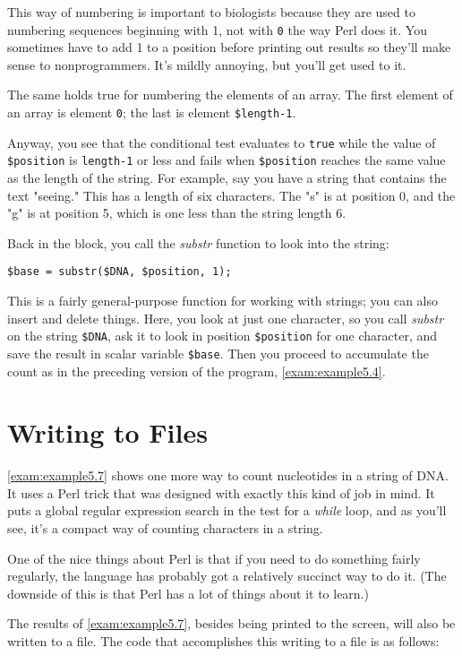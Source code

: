 This way of numbering is important to biologists because they are used to numbering sequences beginning with 1, not with \verb|0| the way Perl does it. You sometimes have to add 1 to a position before printing out results so they'll make sense to nonprogrammers. It's mildly annoying, but you'll get used to it.

The same holds true for numbering the elements of an array. The first element of an array is element \verb|0|; the last is element \verb|$length-1|.

Anyway, you see that the conditional test evaluates to \verb|true| while the value of \verb|$position| is \verb|length-1| or less and fails when \verb|$position| reaches the same value as the length of the string. For example, say you have a string that contains the text "seeing." This has a length of six characters. The "s" is at position 0, and the "g" is at position 5, which is one less than the string length 6.

Back in the block, you call the \textit{substr} function to look into the string: 

\begin{lstlisting}
$base = substr($DNA, $position, 1);
\end{lstlisting}

This is a fairly general-purpose function for working with strings; you can also insert and delete things. Here, you look at just one character, so you call \textit{substr} on the string \verb|$DNA|, ask it to look in position \verb|$position| for one character, and save the result in scalar variable \verb|$base|. Then you proceed to accumulate the count as in the preceding version of the program, \autoref{exam:example5.4}.  
\section{Writing to Files}
\autoref{exam:example5.7} shows one more way to count nucleotides in a string of DNA. It uses a Perl trick that was designed with exactly this kind of job in mind. It puts a global regular expression search in the test for a \textit{while} loop, and as you'll see, it's a compact way of counting characters in a string.

One of the nice things about Perl is that if you need to do something fairly regularly, the language has probably got a relatively succinct way to do it. (The downside of this is that Perl has a lot of things about it to learn.)

The results of \autoref{exam:example5.7}, besides being printed to the screen, will also be written to a file. The code that accomplishes this writing to a file is as follows: 

